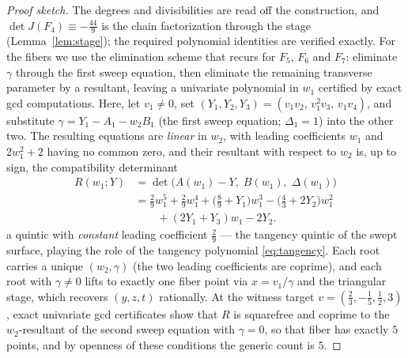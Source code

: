 \documentclass[11pt]{article}
\numberwithin{equation}{section}
\theoremstyle{plain}
\theoremstyle{definition}
\theoremstyle{remark}
\begin{document}
\begin{proof}[Proof sketch]
The degrees and divisibilities are read off the construction, and
$\det J(F_4)\equiv-\tfrac{44}9$ is the chain factorization through the stage
(Lemma~\ref{lem:stage}); the required polynomial identities are verified exactly. For the fibers we use the elimination scheme that recurs for $F_5$,
$F_6$ and $F_7$: eliminate $\gamma$ through the first sweep equation, then
eliminate the remaining transverse parameter by a resultant, leaving a
univariate polynomial in $w_1$ certified by exact gcd computations. Here, let
$v_1\neq0$, set $(Y_1,Y_2,Y_3)=(v_1v_2,\,v_1^2v_3,\,v_1v_4)$, and substitute
$\gamma=Y_1-A_1-w_2B_1$ (the first sweep equation; $\Delta_1=1$) into the
other two. The resulting equations are \emph{linear} in $w_2$, with leading
coefficients $w_1$ and $2w_1^2+2$ having no common zero, and their resultant
with respect to $w_2$ is, up to sign, the compatibility determinant
\[
\begin{aligned}
R(w_1;Y)&=\det\bigl(A(w_1)-Y,\;B(w_1),\;\Delta(w_1)\bigr)\\
 &=\tfrac29w_1^5+\tfrac29w_1^4+\bigl(\tfrac89+Y_1\bigr)w_1^3
 -\bigl(\tfrac43+2Y_2\bigr)w_1^2\\
 &\qquad +(2Y_1+Y_3)w_1-2Y_2.
\end{aligned}
\]
a quintic with \emph{constant} leading coefficient $\tfrac29$ --- the tangency
quintic of the swept surface, playing the role of the tangency polynomial
\eqref{eq:tangency}. Each root carries a unique $(w_2,\gamma)$ (the two
leading coefficients are coprime), and each root with $\gamma\neq0$ lifts to
exactly one fiber point via $x=v_1/\gamma$ and the triangular stage, which
recovers $(y,z,t)$ rationally. At the witness target
$v=(\tfrac23,-\tfrac15,\tfrac12,3)$, exact univariate gcd certificates show
that $R$ is squarefree and coprime to the $w_2$-resultant of the second sweep
equation with $\gamma=0$, so that fiber has exactly $5$ points, and by
openness of these conditions the generic count is $5$.
\end{proof}
\end{document}
